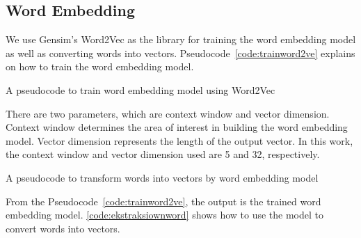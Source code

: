 \subsection{Word Embedding}
We use Gensim's Word2Vec as the library for training the word embedding model as well as converting words into vectors. Pseudocode~\ref{code:trainword2ve} explains on how to train the word embedding model.
\begin{kode}
	
	
	\caption{A pseudocode to train word embedding model using Word2Vec}
	\label{code:trainword2ve}
\end{kode}

There are two parameters, which are context window and vector dimension. Context window determines the area of interest in building the word embedding model. Vector dimension represents the length of the output vector. In this work, the context window and vector dimension used are 5 and 32, respectively.

\begin{kode}
	
	
	\caption{A pseudocode to transform words into vectors by word embedding model}
	\label{code:ekstraksiownword}
\end{kode}
From the Pseudocode~\ref{code:trainword2ve}, the output is the trained word embedding model. \ref{code:ekstraksiownword} shows how to use the model to convert words into vectors.

